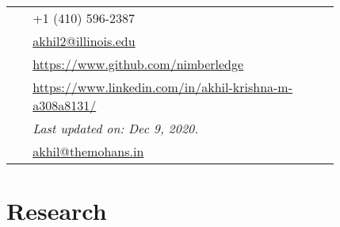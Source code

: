 \documentclass[10pt, oneside, openany]{article} %
\begin{document}
\begin{paracol}{2}
\parbox[top][0.12\textheight][c]{\linewidth}{ %
	\vspace{-0.04\textheight} %
	\colorbox{shade}{ %
		\begin{supertabular}{p{0.05\linewidth}|p{0.775\linewidth}} %
			\raisebox{-1pt}{\faPhone} & +1 (410) 596-2387 \\ %
			\raisebox{0pt}{\small\faEnvelope} & \href{mailto:akhil2@illinois.edu}{akhil2@illinois.edu} \\ %
			\raisebox{-1pt}{\faGithub} & \href{https://www.github.com/nimberledge}{https://www.github.com/nimberledge} \\ %
			\raisebox{-1pt}{\faLinkedinSquare} & \href{https://www.linkedin.com/in/akhil-krishna-m-a308a8131/}{https://www.linkedin.com/in/akhil-krishna-m-a308a8131/} \\ %
			\raisebox{-1pt}{} & \textit{Last updated on: Dec 9, 2020.}\\
			\raisebox{-1pt}{ID} & \href{mailto:akhil@themohans.in}{akhil@themohans.in}\\
		\end{supertabular}
	}
}


\section{Research}





\end{paracol}
\end{document}
